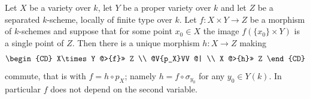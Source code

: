 \begin{theorem}[Rigidity]\label{thm:cube-rigidity}
Let $X$ be a variety over $k$, let $Y$ be a proper variety over $k$ and let
$Z$ be a separated $k$-scheme, locally of finite type over $k$.  Let
$f\colon X\times Y\to Z$ be a morphism of $k$-schemes and suppose that for
some point $x_0\in X$ the image $f(\{x_0\}\times Y)$ is a single point of $Z$.
Then there is a unique morphism $h\colon X\to Z$ making
\[
  \begin{CD}
    X\times Y @>{f}>> Z \\
    @V{p_X}VV @| \\
    X @>{h}>> Z
  \end{CD}
\]
commute, that is with $f=h\circ p_X$; namely $h=f\circ\sigma_{y_0}$ for any
$y_0\in Y(k)$.  In particular $f$ does not depend on the second variable.
\end{theorem}
